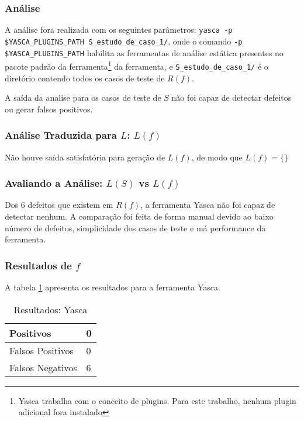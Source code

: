 \subsubsection{Análise}

A análise fora realizada com os seguintes parâmetros:
\lstinline[mathescape=false]{yasca -p $YASCA_PLUGINS_PATH S_estudo_de_caso_1/},
onde o comando \lstinline[mathescape=false]{-p $YASCA_PLUGINS_PATH} habilita as ferramentas de análise estática presentes no pacote padrão da ferramenta\footnote{Yasca trabalha com o conceito de plugins. Para este trabalho, nenhum plugin adicional fora instalado} da ferramenta, e \lstinline{S_estudo_de_caso_1/} é o diretório contendo todos os casos de teste de $R(f)$.

A saída da analise para os casos de teste de $S$ não foi capaz de detectar defeitos ou gerar falsos positivos.

\subsubsection{Análise Traduzida para $L$: $L(f)$}

Não houve saída satisfatória para geração de $L(f)$, de modo que 
$L(f) = \lbrace\rbrace$

\subsubsection{Avaliando a Análise: $L(S)$ vs $L(f)$}

Dos 6 defeitos que existem em $R(f)$, a ferramenta Yasca não foi capaz de detectar nenhum. A comparação foi feita de forma manual devido ao baixo número de defeitos, simplicidade dos casos de teste e má performance da ferramenta.

\subsubsection{Resultados de $f$}

A tabela \ref{tabela_yasca} apresenta os resultados para a ferramenta Yasca.
\begin{table}[h]
  \centering
\begin{tabular}{| l | l |}
  \hline
  Positivos & 0 \\ \hline
  Falsos Positivos & 0 \\ \hline
  Falsos Negativos & 6 \\
  \hline
\end{tabular}
\caption{Resultados: Yasca}
\label{tabela_yasca}
\end{table}

